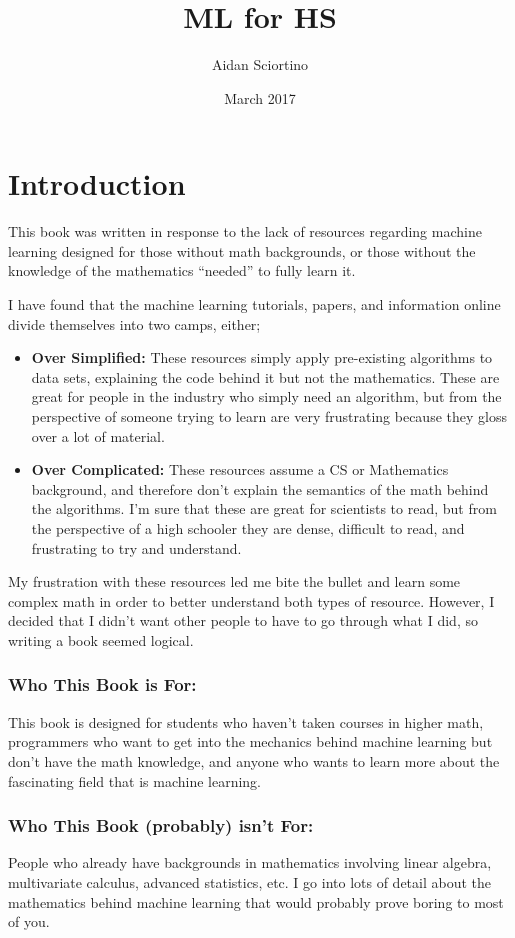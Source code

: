 \documentclass{memoir}
\title{ML for HS}
\author{Aidan Sciortino}
\date{March 2017}
\begin{document}

\tableofcontents
\listoffigures

\chapter*{Introduction}
  This book was written in response to the lack of resources regarding machine learning designed for those without math backgrounds, or those without the knowledge of the mathematics ``needed'' to fully learn it.

  I have found that the machine learning tutorials, papers, and information online divide themselves into two camps, either;
  \begin{itemize}
    \item \textbf{Over Simplified:} These resources simply apply pre-existing algorithms to data sets, explaining the code behind it but not the mathematics. These are great for people in the industry who simply need an algorithm, but from the perspective of someone trying to learn are very frustrating because they gloss over a lot of material.
    \item \textbf{Over Complicated: } These resources assume a CS or Mathematics background, and therefore don't explain the semantics of the math behind the algorithms. I'm sure that these are great for scientists to read, but from the perspective of a high schooler they are dense, difficult to read, and frustrating to try and understand.
\end{itemize}

  My frustration with these resources led me bite the bullet and learn some complex math in order to better understand both types of resource. However, I decided that I didn't want other people to have to go through what I did, so writing a book seemed logical.

  \subsection{Who This Book is For:}
    This book is designed for students who haven't taken courses in higher math, programmers who want to get into the mechanics behind machine learning but don't have the math knowledge, and anyone who wants to learn more about the fascinating field that is machine learning.

  \subsection{Who This Book (probably) isn't For:}
    People who already have backgrounds in mathematics involving linear algebra, multivariate calculus, advanced statistics, etc. I go into lots of detail about the mathematics behind machine learning that would probably prove boring to most of you.
\end{document}
